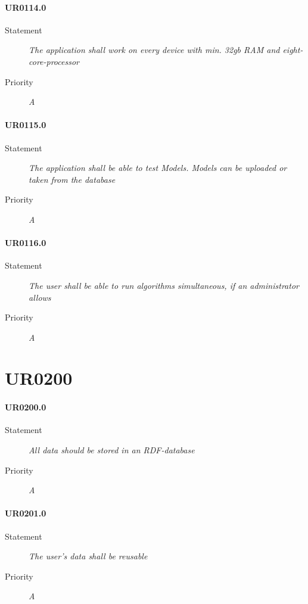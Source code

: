 \paragraph{UR0114.0}
\begin{description}
\item [Statement] \textit{
The application shall work on every device with min. 32gb \gls{RAM} and eight-core-processor
}
\item [Priority] \textit{A}
\end{description}

\paragraph{UR0115.0}
\begin{description}
\item [Statement] \textit{
The application shall be able to test \glspl{Model}. Models can be uploaded or taken from the \gls{database}
}
\item [Priority] \textit{A}
\end{description}

\paragraph{UR0116.0}
\begin{description}
\item [Statement] \textit{
The user shall be able to run algorithms simultaneous, if an \gls{administrator} allows
}
\item [Priority] \textit{A}
\end{description}


\section{UR0200}

\paragraph{UR0200.0}
\begin{description}
\item [Statement] \textit{
All data should be stored in an \gls{RDF}-database 
}
\item [Priority] \textit{A}
\end{description}

\paragraph{UR0201.0}
\begin{description}
\item [Statement] \textit{
The user's data shall be reusable
}
\item [Priority] \textit{A}
\end{description}

